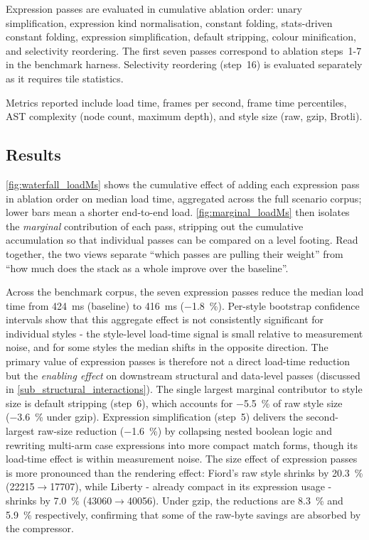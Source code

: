Expression passes are evaluated in cumulative ablation order: unary simplification, expression kind normalisation, constant folding, stats-driven constant folding, expression simplification, default stripping, colour minification, and selectivity reordering.
The first seven passes correspond to ablation steps~1-7 in the benchmark harness.
Selectivity reordering (step~16) is evaluated separately as it requires tile statistics.

Metrics reported include load time, frames per second, frame time percentiles, \ac{AST} complexity (node count, maximum depth), and style size (raw, gzip, Brotli).

\subsection{Results}\label{sub_expr_results}

\cref{fig:waterfall_loadMs} shows the cumulative effect of adding each expression pass in ablation order on median load time, aggregated across the full scenario corpus; lower bars mean a shorter end-to-end load.
\cref{fig:marginal_loadMs} then isolates the \emph{marginal} contribution of each pass, stripping out the cumulative accumulation so that individual passes can be compared on a level footing.
Read together, the two views separate \enquote{which passes are pulling their weight} from \enquote{how much does the stack as a whole improve over the baseline}.

Across the benchmark corpus, the seven expression passes reduce the median load time from \qty{424}{\milli\second} (baseline) to \qty{416}{\milli\second} (\qty{-1.8}{\percent}).
Per-style bootstrap confidence intervals show that this aggregate effect is not consistently significant for individual styles - the style-level load-time signal is small relative to measurement noise, and for some styles the median shifts in the opposite direction.
The primary value of expression passes is therefore not a direct load-time reduction but the \emph{enabling effect} on downstream structural and data-level passes (discussed in \cref{sub_structural_interactions}).
The single largest marginal contributor to style size is default stripping (step~6), which accounts for \qty{-5.5}{\percent} of raw style size (\qty{-3.6}{\percent} under gzip).
Expression simplification (step~5) delivers the second-largest raw-size reduction (\qty{-1.6}{\percent}) by collapsing nested boolean logic and rewriting multi-arm case expressions into more compact match forms, though its load-time effect is within measurement noise.
The size effect of expression passes is more pronounced than the rendering effect: Fiord's raw style shrinks by \qty{20.3}{\percent} (\num{22215}$\to$\qty{17707}{\byte}), while Liberty - already compact in its expression usage - shrinks by \qty{7.0}{\percent} (\num{43060}$\to$\qty{40056}{\byte}).
Under gzip, the reductions are \qty{8.3}{\percent} and \qty{5.9}{\percent} respectively, confirming that some of the raw-byte savings are absorbed by the compressor.


